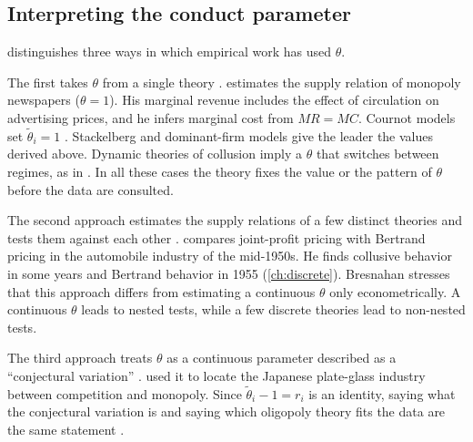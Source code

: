 \subsection{Interpreting the conduct parameter}\label{sec:02-interpret}

\citet[Sec.~2.2]{Bresnahan1989} distinguishes three ways in which empirical work has used $\theta$.

The first takes $\theta$ from a single theory \citep[Sec.~2.2.1]{Bresnahan1989}. \citet{Rosse1970} estimates the
supply relation of monopoly newspapers ($\theta = 1$). His marginal revenue includes the effect of circulation on
advertising prices, and he infers marginal cost from $MR = MC$. Cournot models set $\tilde\theta_i = 1$
\citep[eq.~(6)]{Bresnahan1989}. Stackelberg and dominant-firm models give the leader the values derived above.
Dynamic theories of collusion imply a $\theta$ that switches between regimes, as in \citet{Porter1983}. In all these
cases the theory fixes the value or the pattern of $\theta$ before the data are consulted.

The second approach estimates the supply relations of a few distinct theories and tests them against each other
\citep[Sec.~2.2.2]{Bresnahan1989}. \citet{Bresnahan1987} compares joint-profit pricing with Bertrand pricing in the
automobile industry of the mid-1950s. He finds collusive behavior in some years and Bertrand behavior in 1955
(\cref{ch:discrete}). Bresnahan stresses that this approach differs from estimating a continuous $\theta$ only
econometrically. A continuous $\theta$ leads to nested tests, while a few discrete theories lead to non-nested tests.

The third approach treats $\theta$ as a continuous parameter described as a ``conjectural variation''
\citep[Sec.~2.2.3]{Bresnahan1989}. \citet{Iwata1974} used it to locate the Japanese plate-glass industry between
competition and monopoly. Since $\tilde\theta_i - 1 = r_i$ is an identity, saying what the conjectural variation is
and saying which oligopoly theory fits the data are the same statement \citep[p.~1027]{Bresnahan1989}.

